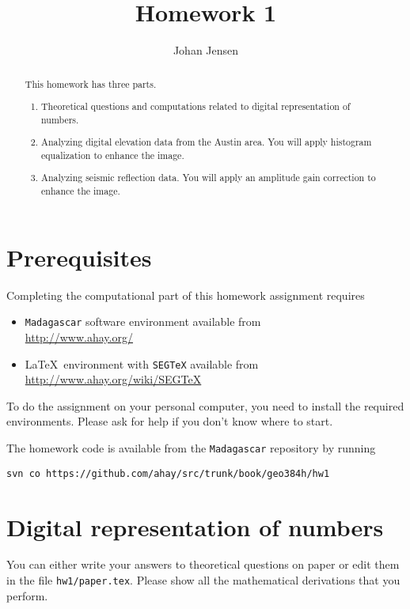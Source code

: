 \author{Johan Jensen}
\title{Homework 1}

\begin{abstract}
  This homework has three parts. 
  \begin{enumerate}
  \item Theoretical questions and computations related to digital representation of numbers.
  \item Analyzing digital elevation data from the Austin area. You will apply 
  histogram equalization to enhance the image.
  \item Analyzing seismic reflection data. You will apply an amplitude gain 
  correction to enhance the image.
  \end{enumerate}
\end{abstract}

\section{Prerequisites}

Completing the computational part of this homework assignment requires
\begin{itemize}
\item \texttt{Madagascar} software environment available from \\
\url{http://www.ahay.org/}
\item \LaTeX\ environment with \texttt{SEGTeX} available from \\ 
\url{http://www.ahay.org/wiki/SEGTeX}
\end{itemize}
To do the assignment on your personal computer, you need to install
the required environments. Please ask for help if you don't know where
to start.

The homework code is available from the \texttt{Madagascar} repository
by running
\begin{verbatim}
svn co https://github.com/ahay/src/trunk/book/geo384h/hw1 
\end{verbatim}


\section{Digital representation of numbers}

You can either write your answers to theoretical questions on paper or
edit them in the file \verb#hw1/paper.tex#. Please show all the
mathematical derivations that you perform.

